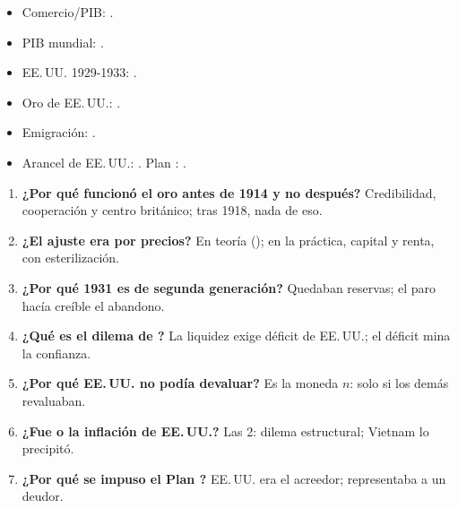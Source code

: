 \documentclass{article}
\begin{document}
\begin{columnas}
\anexorepaso
{}
\begin{itemize}
\item Comercio/PIB: .
\item PIB mundial: .
\item EE.\,UU. 1929-1933: .
\item Oro de EE.\,UU.: .
\item Emigración: .
\item Arancel de EE.\,UU.: . Plan : .
\end{itemize}
\begin{enumerate}
\item \textbf{¿Por qué funcionó el oro antes de 1914 y no después?} Credibilidad, cooperación y centro británico; tras 1918, nada de eso.
\item \textbf{¿El ajuste era por precios?} En teoría (); en la práctica, capital y renta, con esterilización.
\item \textbf{¿Por qué 1931 es de segunda generación?} Quedaban reservas; el paro hacía creíble el abandono.
\item \textbf{¿Qué es el dilema de ?} La liquidez exige déficit de EE.\,UU.; el déficit mina la confianza.
\item \textbf{¿Por qué EE.\,UU. no podía devaluar?} Es la moneda $n$: solo si los demás revaluaban.
\item \textbf{¿Fue  o la inflación de EE.\,UU.?} Las 2: dilema estructural; Vietnam lo precipitó.
\item \textbf{¿Por qué se impuso el Plan ?} EE.\,UU. era el acreedor;  representaba a un deudor.

\end{enumerate}
\end{columnas}
\end{document}
